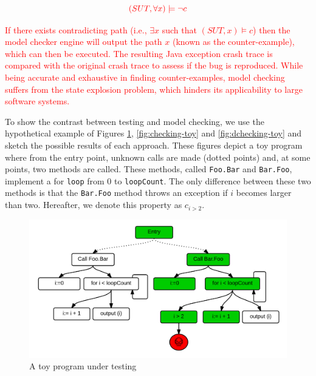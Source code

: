 \documentclass[times, doublespace]{smrauth}
\newcommand{\red}[1]{\textcolor{red}{#1}}
\begin{document}
\begin{equation}
\red{(SUT, \forall x) \models \neg c}
\end{equation}

\red{If there exists contradicting path (i.e., $\exists x$ such that $(SUT, x)
\models c$) then the model checker engine will output the path
$x$ (known as the counter-example), which can then be executed.
The resulting Java exception crash trace is compared with the original
crash trace to assess if the bug is reproduced.
While  being  accurate and exhaustive in finding counter-examples,
model checking suffers from the state explosion problem, which hinders
its applicability to large software systems.}


To show the contrast between testing and model checking, we use the hypothetical example of Figures \ref{fig:testing-toy}, \ref{fig:checking-toy} and \ref{fig:dchecking-toy} and sketch the possible results of each approach. These figures depict a toy program where from the entry point, unknown calls are made (dotted points) and, at some points, two methods are called. These methods, called \texttt{Foo.Bar} and \texttt{Bar.Foo}, implement a for \texttt{loop} from 0 to \texttt{loopCount}. The only difference between these two methods is that the \texttt{Bar.Foo} method throws an exception if $i$ becomes larger than two. Hereafter, we denote this property as $c_{i > 2}$.


\begin{figure}
  \centering
    \includegraphics[scale=0.7]{media/dmc.png}
    \caption{A toy program under testing
    \label{fig:testing-toy}}
\end{figure}
\end{document}
